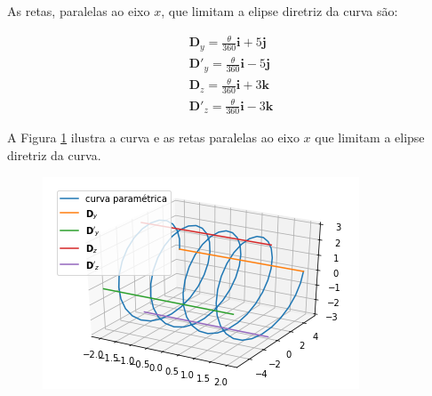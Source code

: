 \documentclass[a4paper,11pt,pagenumber=true]{article}
\theoremstyle{mytheor}
\begin{document}
            As retas, paralelas ao eixo $x$, que limitam a elipse diretriz da curva são: 
            
            \[
                \begin{matrix}
                    \mathbf{D}_y = \frac{\theta}{360} \mathbf{i} + 5 \mathbf{j}     \\
                    \mathbf{D'}_y = \frac{\theta}{360} \mathbf{i} - 5 \mathbf{j}    \\
                    \mathbf{D}_z = \frac{\theta}{360} \mathbf{i} + 3 \mathbf{k}     \\
                    \mathbf{D'}_z = \frac{\theta}{360} \mathbf{i} - 3 \mathbf{k}    
                \end{matrix}
            \]
            
            A Figura \ref{fig:q3answer} ilustra a curva e as retas paralelas ao eixo $x$ que limitam a elipse diretriz da curva.
            
            \begin{figure}[h]
            \centering
                \includegraphics[width=.9\textwidth]{images/q-3answer.png}
                \label{fig:q3answer}
            \end{figure}        
            
\nocite{*}


\end{document}
